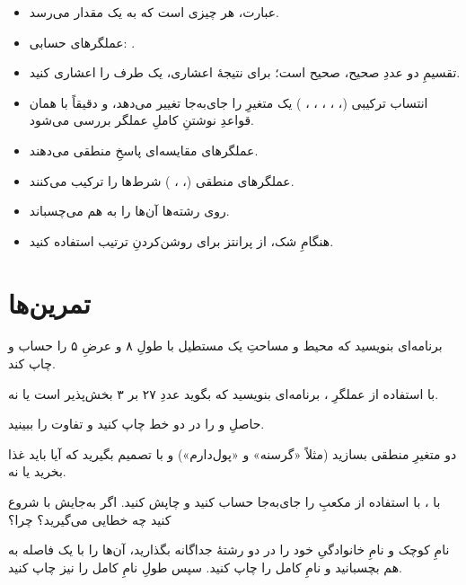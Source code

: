 \begin{itemize}
  \item عبارت، هر چیزی است که به یک مقدار می‌رسد.
  \item عملگرهای حسابی: \code{+ - * / \% **}.
  \item تقسیمِ دو عددِ صحیح، صحیح است؛ برای نتیجهٔ اعشاری، یک طرف را اعشاری
        کنید.
  \item انتساب ترکیبی (\code{+=}، \code{-=}، \code{*=}، \code{/=}، \code{\%=}،
        \code{**=}) یک متغیرِ  را جای‌به‌جا تغییر می‌دهد، و دقیقاً
        با همان قواعدِ نوشتنِ کاملِ عملگر بررسی می‌شود.
  \item عملگرهای مقایسه‌ای پاسخِ منطقی می‌دهند.
  \item عملگرهای منطقی (، ، ) شرط‌ها را ترکیب
        می‌کنند.
  \item \code{+} روی رشته‌ها آن‌ها را به هم می‌چسباند.
  \item هنگامِ شک، از پرانتز برای روشن‌کردنِ ترتیب استفاده کنید.
\end{itemize}

\section{تمرین‌ها}

\exercise برنامه‌ای بنویسید که محیط و مساحتِ یک مستطیل با طولِ ۸ و عرضِ ۵ را
حساب و چاپ کند.

\exercise با استفاده از عملگرِ \code{\%}، برنامه‌ای بنویسید که بگوید عددِ ۲۷ بر
۳ بخش‌پذیر است یا نه.

\exercise حاصلِ  و  را در دو خط چاپ کنید و
تفاوت را ببینید.

\exercise دو متغیرِ منطقی بسازید (مثلاً «گرسنه» و «پول‌دارم») و با 
تصمیم بگیرید که آیا باید غذا بخرید یا نه.

\exercise با ، با استفاده از \code{**=} مکعبِ
 را جای‌به‌جا حساب کنید و چاپش کنید. اگر به‌جایش با
 شروع کنید چه خطایی می‌گیرید؟ چرا؟

\exercise نامِ کوچک و نامِ خانوادگیِ خود را در دو رشتهٔ جداگانه بگذارید، آن‌ها
را با یک فاصله به هم بچسبانید و نامِ کامل را چاپ کنید. سپس طولِ نامِ کامل را
نیز چاپ کنید.
